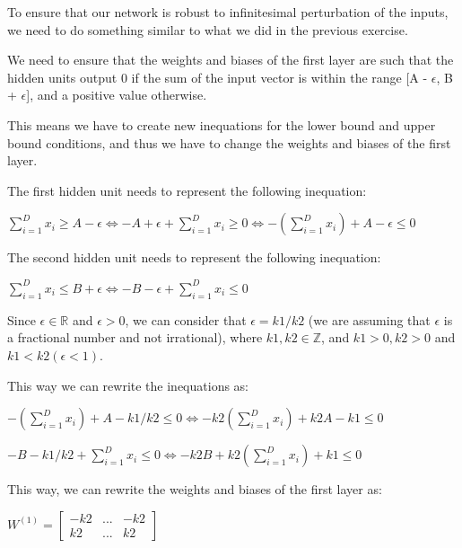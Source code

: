 \documentclass{article}
\begin{document}
\bigskip

To ensure that our network is robust to infinitesimal perturbation of the inputs, we need to do something similar to what we did in the previous exercise.

We need to ensure that the weights and biases of the first layer are such that the hidden units output 0 if the sum of the input vector is 
within the range [A - $\epsilon$, B + $\epsilon$], and a positive value otherwise.

This means we have to create new inequations for the lower bound and upper bound conditions, 
and thus we have to change the weights and biases of the first layer.

\bigskip

The first hidden unit needs to represent the following inequation:

\bigskip

$ \sum_{i=1}^{D} x_i \geq A - \epsilon \iff -A + \epsilon + \sum_{i=1}^{D} x_i \geq 0 
\iff -(\sum_{i=1}^{D} x_i) + A - \epsilon \leq 0$

\bigskip

The second hidden unit needs to represent the following inequation:

\bigskip

$ \sum_{i=1}^{D} x_i \leq B + \epsilon \iff -B - \epsilon + \sum_{i=1}^{D} x_i \leq 0$

\bigskip

Since $\epsilon \in \mathbb{R}$ and $\epsilon > 0$, we can consider that $\epsilon = k1/k2$ (we are assuming that $\epsilon$
is a fractional number and not irrational), where $k1, k2 \in \mathbb{Z}$, and $k1 > 0, k2 > 0$ and $k1 < k2 (\epsilon < 1)$.

\bigskip

This way we can rewrite the inequations as:

\bigskip

$ -(\sum_{i=1}^{D} x_i) + A - k1/k2 \leq 0 \iff -k2(\sum_{i=1}^{D} x_i) + k2A - k1 \leq 0$

\bigskip

$ -B - k1/k2 + \sum_{i=1}^{D} x_i \leq 0 \iff -k2B + k2(\sum_{i=1}^{D} x_i) + k1 \leq 0$

\bigskip

This way, we can rewrite the weights and biases of the first layer as:

\bigskip

\( W^{(1)} = \begin{bmatrix}
    -k2 & ...  & -k2\\
    k2 & ... & k2
\end{bmatrix}
\)
\end{document}
